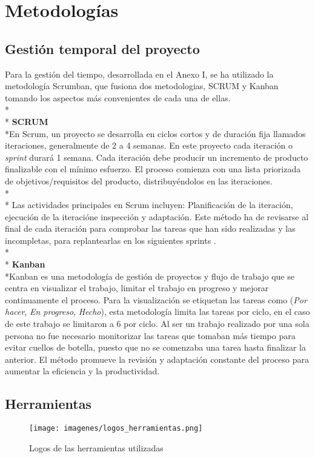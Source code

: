 \documentclass[a4paper,12pt,twoside]{memoir}
\begin{document}
\chapter{Metodologías}
\section{Gestión temporal del proyecto}
\text Para la gestión del tiempo, desarrollada en el Anexo I, se ha utilizado la metodología Scrumban, que fusiona dos metodologias, SCRUM y Kanban tomando los aspectos más convenientes de cada una de ellas\cite{laoyan-2024}.\\*\\*
\textbf{SCRUM}\\*En Scrum, un proyecto se desarrolla en ciclos cortos y de duración fija llamados iteraciones, generalmente de 2 a 4 semanas. En este proyecto cada iteración o \textit{sprint} durará 1 semana. Cada iteración debe producir un incremento de producto finalizable con el mínimo esfuerzo. El proceso comienza con una lista priorizada de objetivos/requisitos del producto, distribuyéndolos en las iteraciones.\\*\\*
Las actividades principales en Scrum incluyen:
Planificación de la iteración, ejecución de la iteracióne inspección y adaptación. Este método ha de revisarse al final de cada iteración para comprobar las tareas que han sido realizadas y las incompletas, para replantearlas en los siguientes sprints \cite{proag2021}.\\*\\*
\textbf{Kanban}\\*Kanban es una metodología de gestión de proyectos y flujo de trabajo que se centra en visualizar el trabajo, limitar el trabajo en progreso y mejorar continuamente el proceso. Para la visualización se etiquetan las tareas como (\textit{Por hacer}, \textit{En progreso}, \textit{Hecho}), esta metodología limita las tareas por ciclo, en el caso de este trabajo se limitaron a 6 por ciclo. Al ser un trabajo realizado por una sola persona no fue necesario monitorizar las tareas que tomaban más tiempo para evitar cuellos de botella, puesto que no se comenzaba una tarea hasta finalizar la anterior. El método promueve la revisión y adaptación constante del proceso para aumentar la eficiencia y la productividad\cite{martins-2024}.

\section{Herramientas}
\begin{figure}
    \centering
    \texttt{[image: imagenes/logos\_herramientas.png]}
    \caption{Logos de las herramientas utilizadas}
    \label{fig:enter-label}
\end{figure}
\end{document}
